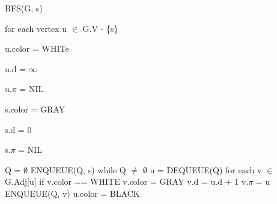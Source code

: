 \documentclass[preview]{standalone}
\begin{document}
\begin{center}
BFS(G, s)

for each vertex u $\in$ G.V - \{s\}

    u.color = WHITe

    u.d = $\infty$

    u.$\pi$ = NIL

s.color = GRAY

s.d = 0

s.$\pi$ = NIL

Q = $\emptyset$
ENQUEUE(Q, s)
while Q $\neq$ $\emptyset$
    u = DEQUEUE(Q)
    for each v $\in$ G.Adj[u]
        if v.color == WHITE
            v.color = GRAY
            v.d = u.d + 1
            v.$\pi$ = u
            ENQUEUE(Q, v)
    u.color = BLACK
\end{center}
\end{document}
